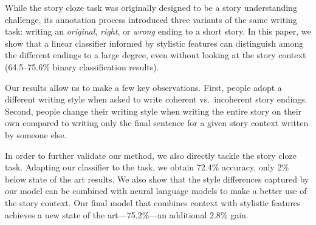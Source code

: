 \documentclass[11pt,a4paper]{article}
\newcommand{\com}[1]{}
\newcommand{\roy}[1]{{\color{orange}\textsc{[#1 --rs]}}}
\renewcommand{\roy}[1]{{\color{orange}[#1 --rs]}}
\renewcommand{\roy}[1]{#1}
\begin{document}
\com{We show that a linear classifier informed with stylistic features can distinguish among {\it original}, {\it right}, and {\it wrong}  endings to a large degree, even without looking at the story context.
Our results allow us to make a few key observations.
First, people adopt a different writing style when asked to write coherent vs.~incoherent story endings.
Second,  people change their writing style when writing the entire story on their own compared to 
writing only the final sentence for a given story context written by someone else.}



While the story cloze task was originally designed to be a story understanding challenge, 
its annotation process introduced three variants of the same writing task: writing an {\it original}, {\it right}, or {\it wrong} ending to a short story.
In this paper, we show that a linear classifier informed by stylistic features can distinguish among the different endings to a large degree, even without looking at the story context (64.5--75.6\% binary classification results).

Our results allow us to make a few key observations.
First, people adopt a different writing style when asked to write coherent vs.~incoherent story endings.
Second,  people change their writing style when writing the entire story on their own compared to 
writing only the final sentence for a given story context written by someone else.


In order to further validate our method, we also directly tackle the
story cloze task. 
Adapting our classifier to the task, we obtain 72.4\% accuracy, \com{a
 12.5\% increase over the previously reported state-of-the-art  \cite{Salle:2016}}\roy{only 2\% below state of the art results}.
We also show that the style differences captured by our model can be combined with neural language models to make a better use of the story context. 
Our final model that combines context with stylistic features achieves
\roy{a new state of the art---}75.2\%---an additional 2.8\% gain\com{, 15.3\% better than the best
published result}.

\com{Our results suggest that writing style is affected by the the writer's state of mind.
Writing a sentence intended to be {\it wrong} turns out quite differently than a sentence intended to be {\it right}. 
Similarly, writing a sentence as part of the story is different from reading a story, and then writing the final sentence.}
\end{document}
